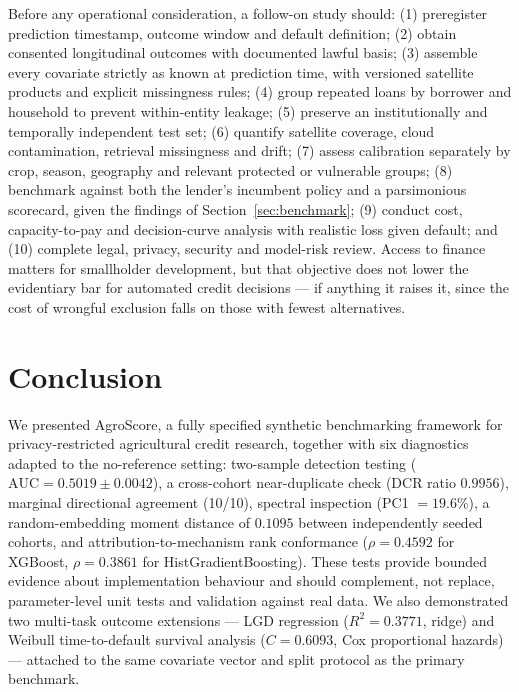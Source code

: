 \documentclass[journal]{IEEEtran}
\newcommand{\auc}{\mbox{AUC}}
\begin{document}
Before any operational consideration, a follow-on study should: (1) preregister prediction timestamp, outcome window and default definition; (2) obtain consented longitudinal outcomes with documented lawful basis; (3) assemble every covariate strictly as known at prediction time, with versioned satellite products and explicit missingness rules; (4) group repeated loans by borrower and household to prevent within-entity leakage; (5) preserve an institutionally and temporally independent test set; (6) quantify satellite coverage, cloud contamination, retrieval missingness and drift; (7) assess calibration separately by crop, season, geography and relevant protected or vulnerable groups; (8) benchmark against both the lender's incumbent policy and a parsimonious scorecard, given the findings of Section~\ref{sec:benchmark}; (9) conduct cost, capacity-to-pay and decision-curve analysis with realistic loss given default; and (10) complete legal, privacy, security and model-risk review. Access to finance matters for smallholder development, but that objective does not lower the evidentiary bar for automated credit decisions --- if anything it raises it, since the cost of wrongful exclusion falls on those with fewest alternatives.

\section{Conclusion}

We presented AgroScore, a fully specified synthetic benchmarking framework for privacy-restricted agricultural credit research, together with six diagnostics adapted to the no-reference setting: two-sample detection testing ($\auc=0.5019\pm0.0042$), a cross-cohort near-duplicate check (DCR ratio $0.9956$), marginal directional agreement (10/10), spectral inspection (PC1 $=19.6\%$), a random-embedding moment distance of $0.1095$ between independently seeded cohorts, and attribution-to-mechanism rank conformance ($\rho=0.4592$ for XGBoost, $\rho=0.3861$ for HistGradientBoosting). These tests provide bounded evidence about implementation behaviour and should complement, not replace, parameter-level unit tests and validation against real data. We also demonstrated two multi-task outcome extensions --- LGD regression ($R^2=0.3771$, ridge) and Weibull time-to-default survival analysis ($C=0.6093$, Cox proportional hazards) --- attached to the same covariate vector and split protocol as the primary benchmark.
\end{document}
